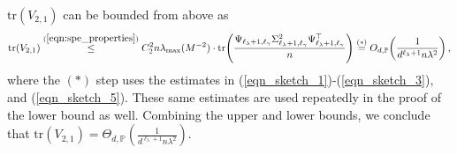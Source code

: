 \documentclass{article}
\theoremstyle{plain}
\theoremstyle{definition}
\theoremstyle{remark}
\begin{document}
\begin{appendix}

\color{black}



$\mathrm{tr}(V_{2,1})$ can be bounded from above as
\begin{equation*}
    \begin{aligned}
        \mathrm{tr}(V_{2,1})
        \overset{(\ref{eqn:spe_properties})}{\le}
        C_2^2 n \lambda_{\max}(M^{-2})
        \cdot
        \mathrm{tr}\!\left(
        \frac{\Psi_{\ell_\lambda+1,\ell_\gamma}\Sigma_{\ell_\lambda+1,\ell_\gamma}^2
        \Psi_{\ell_\lambda+1,\ell_\gamma}^\top}{n}
        \right)
        \overset{(*)}{=}
        O_{d,\mathbb P}\!\left(\frac{1}{d^{\ell_\lambda+1}n\lambda^2}\right), 
    \end{aligned}
\end{equation*}
where the $(*)$ step uses the estimates in (\ref{eqn_sketch_1})-(\ref{eqn_sketch_3}), and (\ref{eqn_sketch_5}). 
These same estimates are used repeatedly in the proof of the lower bound as well. 
Combining the upper and lower bounds, we conclude that 
$
\mathrm{tr}(V_{2,1})
=
\Theta_{d,\mathbb P}\!\left(\frac{1}{d^{\ell_\lambda+1}n\lambda^2}\right)$. 







\end{appendix}
\end{document}
